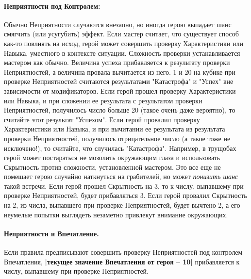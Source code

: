 \paragraph{Неприятности под Контролем:} Обычно Неприятности случаются внезапно, но иногда герою выпадает шанс смягчить (или усугубить) эффект. Если мастер считает, что существует способ как-то повлиять на исход, герой может совершить проверку Характеристики или Навыка, уместного в контексте ситуации. Сложность проверки устанавливается мастером как обычно. Величина успеха прибавляется к результату проверки Неприятностей, а величина провала вычитается из него. 1 и 20 на кубике при проверке Неприятностей считаются результатами "Катастрофа" и "Успех" вне зависимости от модификаторов.
\newline Если герой прошел проверку Характеристики или Навыка, и при сложении ее результата с результатом проверки Неприятностей, получилось число больше 20 (такое очень даже вероятно), то считайте этот результат "Успехом". Если герой провалил проверку Характеристики или Навыка, и при вычитании ее результата из результата проверки Неприятностей, получилось отрицательное число (а такое тоже не исключено!), то считайте, что случилась "Катастрофа".
\newline Например, в трущобах герой может постараться не мозолить окружающим глаза и использовать Скрытность против сложности, установленной мастером. Это все еще не помешает герою случайно наткнуться на грабителей, но может \textit{понизить шанс} такой встречи. Если герой прошел Скрытность на 3, то к числу, выпавшему при проверке Неприятностей, будет прибавляться 3. Если герой провалил Скрытность на 2, из числа, выпавшего при проверке Неприятностей, будет вычтено 2, а его неумелые попытки выглядеть незаметно привлекут внимание окружающих.
\paragraph{Неприятности и Впечатление.} Если правила предписывают совершить проверку Неприятностей под контролем Впечатления, \textbf{|текущее значение Впечатления от героя – 10|} прибавляется к числу, выпавшему при проверке Неприятностей.
